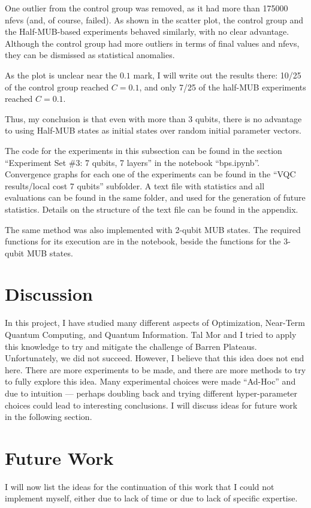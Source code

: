 \documentclass[a4paper,12pt]{article}
\begin{document}
One outlier from the control group was removed, as it had more than 175000 nfevs (and, of course, failed).
As shown in the scatter plot, the control group and the Half-MUB-based experiments behaved similarly, with no clear advantage.
Although the control group had more outliers in terms of final values and nfevs, they can be dismissed as statistical anomalies.

As the plot is unclear near the $0.1$ mark, I will write out the results there: 10/25 of the control group reached $C=0.1$, and only 7/25 of the half-MUB experiments reached $C=0.1$.

Thus, my conclusion is that even with more than 3 qubits, there is no advantage to using Half-MUB states as initial states over random initial parameter vectors.

The code for the experiments in this subsection can be found in the section ``Experiment Set \#3: 7 qubits, 7 layers'' in the notebook ``bps.ipynb''.
Convergence graphs for each one of the experiments can be found in the ``VQC results/local cost 7 qubits'' subfolder. A text file with statistics and all evaluations can be found in the same folder, and used for the generation of future statistics. Details on the structure of the text file can be found in the appendix.

The same method was also implemented with 2-qubit MUB states.
The required functions for its execution are in the notebook, beside the functions for the 3-qubit MUB states.


\section{Discussion}
In this project, I have studied many different aspects of Optimization, Near-Term Quantum Computing, and Quantum Information.
Tal Mor and I tried to apply this knowledge to try and mitigate the challenge of Barren Plateaus. Unfortunately, we did not succeed. However, I believe that this idea does not end here.
There are more experiments to be made, and there are more methods to try to fully explore this idea.
Many experimental choices were made ``Ad-Hoc'' and due to intuition --- perhaps doubling back and trying different hyper-parameter choices could lead to interesting conclusions.
I will discuss ideas for future work in the following section.

\section{Future Work} \label{sec:future_work}
I will now list the ideas for the continuation of this work that I could not implement myself, either due to lack of time or due to lack of specific expertise.
\end{document}
